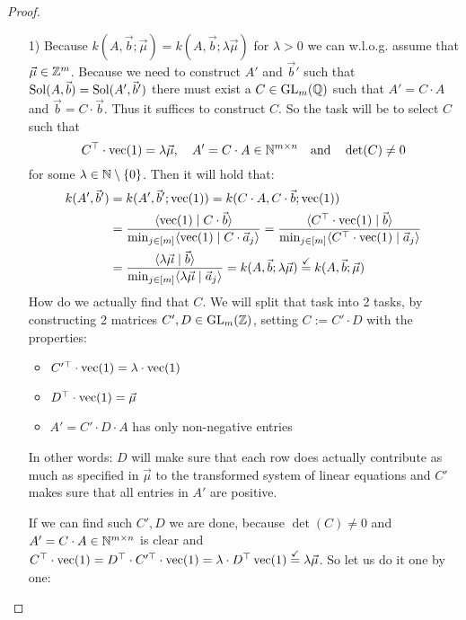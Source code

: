 \begin{proof}
    \begin{enumerate}
        \item[1)] Because $k(A, \vec b; \vec \mu) = k(A, \vec b; \lambda \vec \mu)$ for $\lambda > 0$ we can w.l.o.g. assume that $\vec \mu \in \mathbb{Z}^m$. Because we need to construct $A'$ and $\vec b'$ such that $\operatorname{Sol}(A, \vec b) = \operatorname{Sol}(A', \vec b')$ there must exist a $C \in \operatorname{GL}_m(\mathbb{Q})$ such that $A' = C\cdot A$ and $\vec b = C\cdot \vec b$. Thus it suffices to construct $C$. So the task will be to select $C$ such that
        $$C^\top \cdot \operatorname{vec}(1) = \lambda \vec\mu, \quad A' = C\cdot A \in \mathbb{N}^{m \times n} \quad \textrm{and} \quad \det(C) \neq 0$$
        for some $\lambda \in \mathbb{N} \setminus \{0\}$. Then it will hold that:
        \begin{align*}
            k(A', \vec b') &= k(A', \vec b'; \operatorname{vec}(1)) = k(C \cdot A, C \cdot \vec b; \operatorname{vec}(1))\\
            &= \frac{\langle \operatorname{vec}(1) \mid C \cdot \vec b \rangle}{\min_{j \in [m]} \langle \operatorname{vec}(1) \mid C \cdot \vec a_j \rangle} = \frac{\langle C^\top \cdot \operatorname{vec}(1) \mid \vec b \rangle}{\min_{j \in [m]} \langle C^\top \cdot \operatorname{vec}(1) \mid \vec a_j \rangle}\\
            &= \frac{\langle \lambda\vec{\mu} \mid \vec b \rangle}{\min_{j \in [m]} \langle \lambda\vec \mu \mid \vec a_j \rangle} = k(A, \vec b; \lambda\vec\mu) \stackrel{\checkmark}{=} k(A, \vec b; \vec\mu)
        \end{align*}
        How do we actually find that $C$. We will split that task into 2 tasks, by constructing 2 matrices $C', D  \in \operatorname{GL}_m(\mathbb{Z})$, setting $C := C' \cdot D$ with the properties:
        \begin{itemize}
            \item $C'^\top \cdot \operatorname{vec}(1) = \lambda \cdot \operatorname{vec}(1)$
            \item $D^\top \cdot \operatorname{vec}(1) = \vec\mu$
            \item $A' = C' \cdot D\cdot A$ has only non-negative entries
        \end{itemize}
        In other words: $D$ will make sure that each row does actually contribute as much as specified in $\vec\mu$ to the transformed system of linear equations and $C'$ makes sure that all entries in $A'$ are positive.

        If we can find such $C', D$ we are done, because $\det(C) \neq 0$ and $ A' = C\cdot A \in \mathbb{N}^{m \times n}$ is clear and $C^\top \cdot \operatorname{vec}(1) = D^\top \cdot C'^\top\cdot \operatorname{vec}(1) = \lambda \cdot D^\top \operatorname{vec}(1) \stackrel{\checkmark}{=}\lambda\vec\mu$. So let us do it one by one:


\end{enumerate}
\end{proof}
